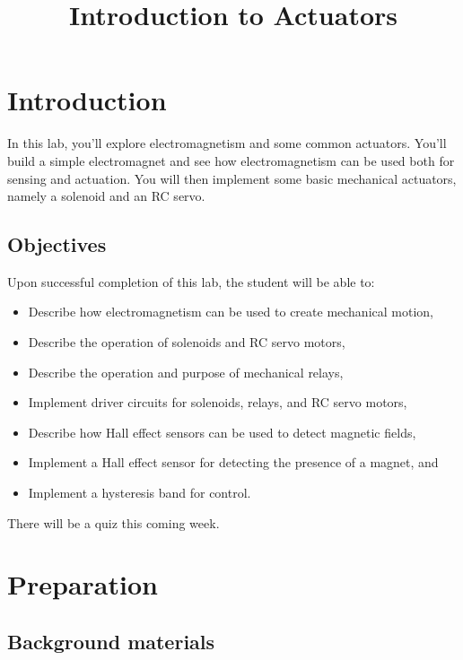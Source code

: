 \documentclass[11pt]{article} %
\title{Introduction to Actuators}
\author{}
\date{} %
\begin{document}
\maketitle


\section*{Introduction}

In this lab, you’ll explore electromagnetism and some common actuators. You’ll build a simple electromagnet and see how electromagnetism can be used both for sensing and actuation. You will then implement some basic mechanical actuators, namely a solenoid and an RC servo.

\subsection*{Objectives}

Upon successful completion of this lab, the student will be able to:
\begin{itemize}
\item Describe how electromagnetism can be used to create mechanical motion,
\item Describe the operation of solenoids and RC servo motors,
\item Describe the operation and purpose of mechanical relays,
\item Implement driver circuits for solenoids, relays, and RC servo motors,
\item Describe how Hall effect sensors can be used to detect magnetic fields,
\item Implement a Hall effect sensor for detecting the presence of a magnet, and
\item Implement a hysteresis band for control.
\end{itemize}

There will be a quiz this coming week.

\section*{Preparation}
\subsection*{Background materials}
\end{document}
